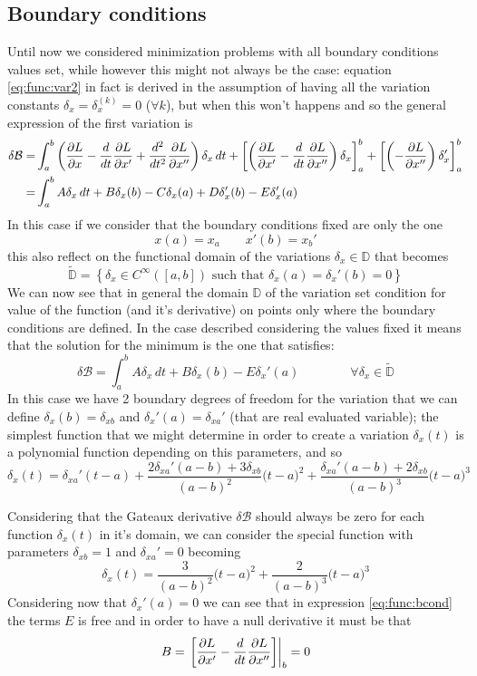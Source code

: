 	\subsection{Boundary conditions} 
	Until now we considered minimization problems with all boundary conditions values set, while however this might not always be the case: equation \ref{eq:func:var2} in fact is derived in the assumption of having all the variation constants $\delta_x = \delta_x^{(k)} = 0$ ($\forall k$), but when this won't happens and so the general expression of the first variation is
	\begin{align*}
		\delta \mathcal B=& \int_a^b \left( \frac{\partial L }{\partial x} - \frac d{dt}\frac{\partial L }{\partial x'} + \frac{d^2}{dt^2}\frac{\partial L }{\partial x''} \right) \delta_x\, dt + \left[ \left( \frac{\partial L }{\partial x'} - \frac d{dt} \frac{\partial L }{\partial x''} \right) \delta_x \right]_a^b + \left[ \left(-\frac{\partial L }{\partial x''} \right) \delta_x' \right]_a^b \\
		= & \int_a^b A\delta_x\, dt + B \delta_x(b) - C\delta_x(a) + D \delta_x'(b) - E \delta_x'(a)
	\end{align*}
	In this case if we consider that the boundary conditions fixed are only the one
	\[ x(a) = x_a \qquad x'(b) = x_b' \]
	this also reflect on the functional domain of the variations $\delta_x\in \mathds D$ that becomes
	\[ \tilde {\mathds D} = \left\{ \delta_x\in C^{\infty}([a,b]) \textrm{ such that } \delta_x(a) = \delta_x'(b) = 0 \right\} \]
	We can now see that in general the domain $\mathds D$ of the variation set condition for value of the function (and it's derivative) on points only where the boundary conditions are defined. In the case described considering the values fixed it means that the solution for the minimum is the one that satisfies:
	\begin{equation} \label{eq:func:bcond}
		\delta\mathcal B = \int_a^b A \delta_x\, dt + B \delta_x(b) - E\delta_x'(a)  \qquad \qquad \forall \delta_x \in \tilde{\mathds D}
	\end{equation}
	In this case we have 2 boundary degrees of freedom for the variation that we can define $\delta_x(b) = \delta_{xb}$ and $\delta_{x}'(a) = \delta_{xa}'$ (that are real evaluated variable); the simplest function that we might determine in order to create a variation $\delta_x(t)$ is a polynomial function depending on this parameters, and so
	\[ \delta_x(t) = \delta_{xa}' (t-a) + \frac{ 2\delta_{xa}'(a-b) + 3 \delta_{xb}  }{(a-b)^2} \big( t-a \big)^2 + \frac{ \delta_{xa}'(a-b) + 2 \delta_{xb} }{(a-b)^3} \big(t-a\big)^3  \]
	
	Considering that the Gateaux derivative $\delta \mathcal B$ should always be zero for each function $\delta_x(t)$ in it's domain, we can consider the special function with parameters  $\delta_{xb} = 1$ and $\delta_{xa}' = 0$ becoming
	\[ \delta_x(t) = \frac 3{(a-b)^2}\big(t-a\big)^2 + \frac 2{(a-b)^3} \big(t-a\big)^3\]
	Considering now that $\delta_x'(a) = 0$ we can see that in expression \ref{eq:func:bcond} the terms $E$ is free and in order to have a null derivative it must be that 
	\[ B = \left. \left[ \frac{\partial L }{\partial x'} - \frac d {dt} \frac{\partial L }{\partial x''} \right] \right|_b = 0 \]
	
